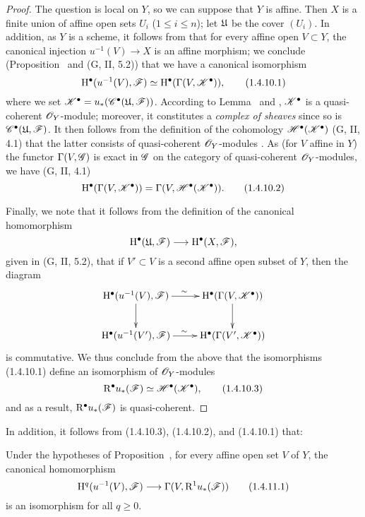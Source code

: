 \begin{proof}
\label{proof-3.1.4.10}
The question is local on $Y$, so we can suppose that $Y$ is affine.
Then $X$ is a finite union of affine open sets $U_i$ ($1\leq i\leq n$); let $\mathfrak{U}$ be the cover $(U_i)$.
In addition, as $Y$ is a scheme, it follows from  that for every affine open $V\subset Y$, the canonical injection $u^{-1}(V)\to X$ is an affine morphism; we conclude (Proposition~ and (G, II, 5.2)) that we have a canonical isomorphism
\[
  \mathrm{H}^\bullet(u^{-1}(V),\mathscr{F})\simeq\mathrm{H}^\bullet(\Gamma(V,\mathscr{K}^\bullet)),
  \tag{1.4.10.1}
\]
where we set $\mathscr{K}^\bullet=u_*(\mathscr{C}^\bullet(\mathfrak{U},\mathscr{F}))$.
According to Lemma~ and , $\mathscr{K}^\bullet$ is a quasi-coherent $\mathscr{O}_Y$-module; moreover, it constitutes a \emph{complex of sheaves} since so is $\mathscr{C}^\bullet(\mathfrak{U},\mathscr{F})$.
It then follows from the definition of the cohomology $\mathscr{H}^\bullet(\mathscr{K}^\bullet)$ (G, II, 4.1) that the latter consists of quasi-coherent $\mathscr{O}_Y$-modules .
As (for $V$ affine in $Y$) the functor $\Gamma(V,\mathscr{G})$ is exact in $\mathscr{G}$ on the category of quasi-coherent $\mathscr{O}_Y$-modules, we have (G, II, 4.1)
\[
  \mathrm{H}^\bullet(\Gamma(V,\mathscr{K}^\bullet))=\Gamma(V,\mathscr{H}^\bullet(\mathscr{K}^\bullet)).
  \tag{1.4.10.2}
\]

Finally, we note that it follows from the definition of the canonical homomorphism
\[
  \HH^\bullet(\fk{U},\sh{F})\to\HH^\bullet(X,\sh{F}),
\]
given in (G, II, 5.2), that if $V'\subset V$ is a second affine open subset of $Y$, then the
diagram
\[
  \xymatrix{
    \HH^\bullet(u^{-1}(V),\sh{F})\ar[r]^\sim\ar[d] &
    \HH^\bullet(\Gamma(V,\sh{K}^\bullet))\ar[d]\\
    \HH^\bullet(u^{-1}(V'),\sh{F})\ar[r]^\sim &
    \HH^\bullet(\Gamma(V',\sh{K}^\bullet))
  }
\]
is commutative.
We thus conclude from the above that the isomorphisms (1.4.10.1) define an isomorphism of $\mathscr{O}_Y$-modules
\[
  \mathrm{R}^\bullet u_*(\mathscr{F})\simeq\mathscr{H}^\bullet(\mathscr{K}^\bullet),
  \tag{1.4.10.3}
\]
and as a result, $\mathrm{R}^\bullet u_*(\mathscr{F})$ is quasi-coherent.
\end{proof}

In addition, it follows from (1.4.10.3), (1.4.10.2), and (1.4.10.1) that:
\begin{cor}[1.4.11]
\label{3.1.4.11}
Under the hypotheses of Proposition~, for every affine open set $V$ of $Y$, the canonical homomorphism
\[
  \HH^q(u^{-1}(V),\sh{F})\to\Gamma(V,\RR^1 u_*(\sh{F}))
  \tag{1.4.11.1}
\]
is an isomorphism for all $q\geq 0$.
\end{cor}

